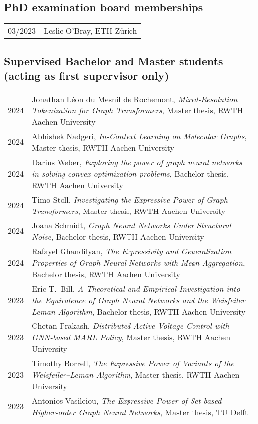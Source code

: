 \documentclass[11pt, a4paper, DIV=14, headings=small]{scrartcl}
\begin{document}
	\subsection*{PhD examination board memberships}
	\begin{longtabu}{p{2.1cm}p{12.0cm}}
		03/2023 &  Leslie O'Bray, ETH Zürich \\
	\end{longtabu}
	
	\subsection*{Supervised Bachelor and Master students (acting as first supervisor only)}
	\begin{longtabu}{p{2.1cm}p{12.0cm}}
		2024 & Jonathan Léon du Mesnil de Rochemont, \emph{Mixed-Resolution Tokenization for Graph Transformers}, Master thesis, RWTH Aachen University \\	
		2024 & Abhishek Nadgeri, \emph{In-Context Learning on Molecular Graphs}, Master thesis, RWTH Aachen University \\	
		2024 & Darius Weber, \emph{Exploring the power of graph neural networks in solving convex optimization problems}, Bachelor thesis, RWTH Aachen University \\	
		2024 & Timo Stoll, \emph{Investigating the Expressive Power of Graph Transformers}, Master thesis, RWTH Aachen University \\	
		2024 & Joana Schmidt, \emph{Graph Neural Networks Under Structural Noise}, Bachelor thesis, RWTH Aachen University \\	
		2024 & Rafayel Ghandilyan, \emph{The Expressivity and Generalization Properties of Graph Neural Networks with Mean Aggregation}, Bachelor thesis, RWTH Aachen University \\	
		2023 & Eric T.\ Bill, \emph{A Theoretical and Empirical Investigation into the Equivalence of Graph Neural Networks and the Weisfeiler--Leman Algorithm}, Bachelor thesis, RWTH Aachen University\\    
		2023 & Chetan Prakash, \emph{Distributed Active Voltage Control with GNN-based MARL Policy}, Master thesis, RWTH Aachen University\\  
		2023 & Timothy Borrell, \emph{The Expressive Power of Variants of the Weisfeiler--Leman Algorithm}, Master thesis, RWTH Aachen University                                     \\
		2023 & Antonios Vasileiou, \emph{The Expressive Power of Set-based Higher-order Graph Neural Networks}, Master thesis, TU Delft                                                                             \\

\end{longtabu}
\end{document}
